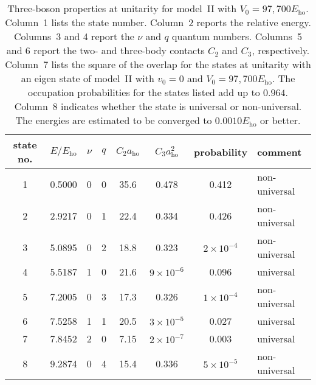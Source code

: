 \documentclass[aps,pra,twocolumn,showpacs,superscriptaddress]{revtex4}
\begin{document}
\begin{widetext}

\begin{table}
  \begin{center}
  \begin{tabular}{c|c|c|c|c|c|c|l}
    state no.  & $E/ E_{\text{ho}}$ & $\nu$ & $q$ & $C_2 a_{\text{ho}}$ & $C_3 a_{\text{ho}}^2$ & probability & comment \\
    \hline
  1& 0.5000 & 0 & 0 & 35.6 & 0.478 & 0.412 & non-universal \\
  2& 2.9217 & 0 & 1 & 22.4 & 0.334 & 0.426 & non-universal \\
  3& 5.0895 & 0 & 2 & 18.8 & 0.323 & $2 \times 10^{-4}$ & non-universal \\
  4& 5.5187 & 1 & 0 & 21.6 & $9 \times 10^{-6}$ & 0.096 & universal  \\
  5& 7.2005 & 0 & 3 & 17.3 & 0.326 & $1 \times 10^{-4}$  & non-universal \\
  6& 7.5258 & 1 & 1 & 20.5 & $3 \times 10^{-5}$ & 0.027 &  universal \\
  7& 7.8452 & 2 & 0 & 7.15 & $2 \times 10^{-7}$ & 0.003 &  universal \\
  8& 9.2874 & 0 & 4 & 15.4 & 0.336 & $5 \times 10^{-5}$ &  non-universal
  \end{tabular}
  \caption{Three-boson properties at unitarity for
    model~II with $V_0=97,700 E_{\text{ho}}$.
    Column~1 lists the state number.
    Column~2 reports
    the relative energy.
    Columns~3 and 4 report the $\nu$ and $q$
    quantum numbers.
    Columns~5 and 6 report the two- and three-body contacts 
$C_2$ and $C_3$, respectively.
    Column~7 lists the square of the overlap for
    the states at unitarity with an eigen state
of model~II with $v_0=0$ and $V_0=97,700 E_{\text{ho}}$.
    The occupation probabilities for the states
listed add up to
    $0.964$.
  Column~8 indicates whether the state is universal or non-universal.
The energies are estimated to be converged to $0.0010E_{\text{ho}}$
or better.
}
\label{tab_n3}
  \end{center}
  \end{table}

\end{widetext}
\end{document}
